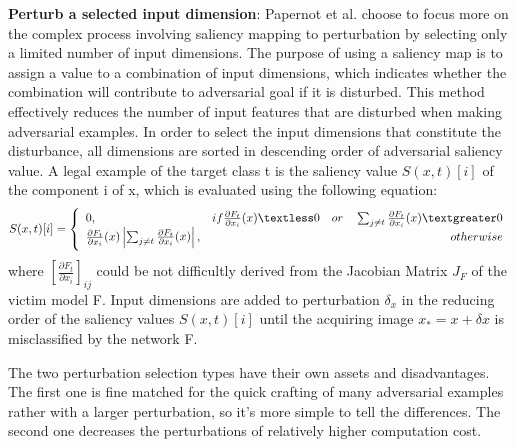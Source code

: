 \textbf{Perturb a selected input dimension}: Papernot et al.\cite{papernot_limitations_2015} choose to focus more on the complex process involving saliency mapping to perturbation by selecting only a limited number of input dimensions. The purpose of using a saliency map is to assign a value to a combination of input dimensions, which indicates whether the combination will contribute to adversarial goal if it is disturbed. This method effectively reduces the number of input features that are disturbed when making adversarial examples. In order to select the input dimensions that constitute the disturbance, all dimensions are sorted in descending order of adversarial saliency value. A legal example of the target class t is the saliency value  \(S(x,t)[i]\) of the component i of x, which is evaluated using the following equation:
\begin{equation}
S(x,t)[i]=\left\{
             \begin{array}{lr}
             0, & if \frac{\partial F_{t}}{\partial x_{i}}(x)\textless 0 \quad or \quad \sum_{j\neq t} \frac{\partial F_{t}}{\partial x_{i}}(x) \textgreater 0 \\
             \frac{\partial F_{t}}{\partial x_{i}}(x)\begin{vmatrix}
                \sum_{j\neq t} \frac{\partial F_{t}}{\partial x_{i}}(x)
                \end{vmatrix}, & otherwise\\
            
             \end{array}
\right.
\nonumber
\end{equation}
where \([\frac{\partial F_{t}}{\partial x_{i}}]_{ij}\) could be not difficultly derived from the Jacobian Matrix \(J_{F}\) of the victim model F. Input dimensions are added to perturbation \(\delta_{x}\) in the reducing order of the saliency values \(S(x,t)[i]\) until the acquiring image \(x_{*} = x + \delta x\) is misclassified by the network F.

The two perturbation selection types have their own assets and disadvantages. The first one is fine matched for the quick crafting of many adversarial examples rather with a larger perturbation, so it's more simple to tell the differences. The second one decreases the perturbations of relatively higher computation cost.

